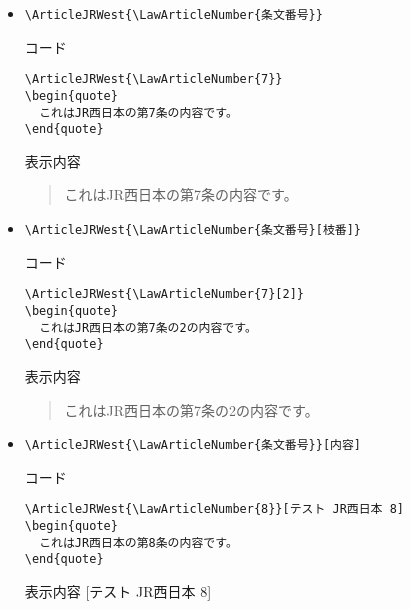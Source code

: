 \documentclass[oneside,10pt,a4paper]{jsarticle}
\begin{document}
  \begin{itemize}
    \item \verb|\ArticleJRWest{\LawArticleNumber{条文番号}}|
      \begin{itembox}[l]{コード}
        {\footnotesize\begin{verbatim}
\ArticleJRWest{\LawArticleNumber{7}}
\begin{quote}
  これはJR西日本の第7条の内容です。
\end{quote}\end{verbatim}}
      \end{itembox}
      \begin{itembox}[l]{表示内容}
        \begin{quote}
          これはJR西日本の第7条の内容です。
        \end{quote}
      \end{itembox}
    \item \verb|\ArticleJRWest{\LawArticleNumber{条文番号}[枝番]}|
      \begin{itembox}[l]{コード}
        {\footnotesize\begin{verbatim}
\ArticleJRWest{\LawArticleNumber{7}[2]}
\begin{quote}
  これはJR西日本の第7条の2の内容です。
\end{quote}\end{verbatim}}
      \end{itembox}
      \begin{itembox}[l]{表示内容}
        \begin{quote}
          これはJR西日本の第7条の2の内容です。
        \end{quote}
      \end{itembox}
    \newpage
    \item \verb|\ArticleJRWest{\LawArticleNumber{条文番号}}[内容]|
      \begin{itembox}[l]{コード}
        {\footnotesize\begin{verbatim}
\ArticleJRWest{\LawArticleNumber{8}}[テスト JR西日本 8]
\begin{quote}
  これはJR西日本の第8条の内容です。
\end{quote}\end{verbatim}}
      \end{itembox}
      \begin{itembox}[l]{表示内容}
        [テスト JR西日本 8]
        \begin{quote}

\end{quote}
\end{itembox}
\end{itemize}
\end{document}
